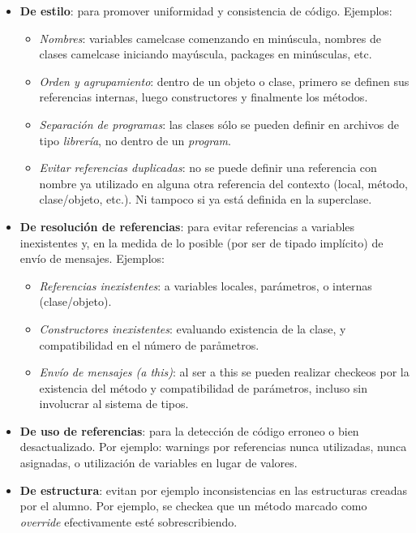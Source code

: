 \begin{itemize}
  \item \textbf{De estilo}: para promover uniformidad y consistencia de código.
  Ejemplos:
  		\begin{itemize}
  			\item \textit{Nombres}: variables camelcase comenzando en minúscula,
  			nombres de clases camelcase iniciando mayúscula, packages en minúsculas, etc.
  			\item \textit{Orden y agrupamiento}: dentro de un objeto o clase, primero
  			se definen sus referencias internas, luego constructores y finalmente los métodos.
  			\item \textit{Separación de programas}: las clases sólo se pueden definir
  			en archivos de tipo \textit{librería}, no dentro de un \textit{program}.
  			\item \textit{Evitar referencias duplicadas}: no se puede definir una
  			referencia con nombre ya utilizado en alguna otra referencia del contexto (local, método,
  			clase/objeto, etc.). Ni tampoco si ya está definida en la superclase.
		\end{itemize}
  \item \textbf{De resolución de referencias}: para evitar referencias a
  variables inexistentes y, en la medida de lo posible (por ser de tipado
  implícito) de envío de mensajes. Ejemplos:
  		\begin{itemize}
		  \item \textit{Referencias inexistentes}: a variables locales, parámetros, o
		  internas (clase/objeto).
		  \item \textit{Constructores inexistentes}: evaluando existencia de la
		  clase, y compatibilidad en el número de paråmetros.
		  \item \textit{Envío de mensajes (a this)}: al ser a this se pueden realizar
		  checkeos por la existencia del método y compatibilidad de parámetros, incluso sin
		  involucrar al sistema de tipos.
		\end{itemize}
  \item \textbf{De uso de referencias}: para la detección de código
  	erroneo o bien desactualizado. Por ejemplo: warnings por referencias nunca
 	utilizadas, nunca asignadas, o utilización de variables en lugar de valores.
  \item \textbf{De estructura}: evitan por ejemplo inconsistencias en las
  estructuras creadas por el alumno. Por ejemplo, se checkea
  que un método marcado como \textit{override} efectivamente esté
	sobrescribiendo.
\end{itemize}

